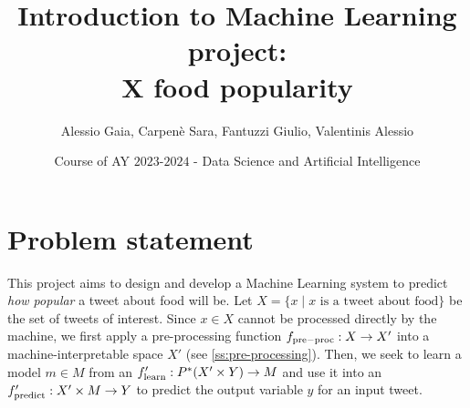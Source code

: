 \documentclass{article}
\title{Introduction to Machine Learning project:\\X food popularity}
\author[*]{Alessio Gaia, Carpenè Sara, Fantuzzi Giulio, Valentinis Alessio}
\affil[*]{
    problem statement,
    solution design,
    solution development,
    data gathering,
    writing
}
\date{Course of AY $2023$-$2024$ - Data Science and Artificial Intelligence}
\begin{document}
\maketitle

\section{Problem statement}
\label{sec:problem_statement}
This project aims to design and develop a Machine Learning system to predict \textit{how popular} a tweet about food will be. Let $X=\{x \mid x \text{ is a tweet about food}\}$ be the set of tweets of interest. Since $x \in X$ cannot be processed directly by the machine, we first apply a pre-processing function $f_{\rm pre-proc}: X \rightarrow X'$ into a machine-interpretable space $X'$ (see \cref{ss:pre-processing}). Then, we seek to learn a model $m \in M$ from an $f'_{\rm learn}: P^{*}(X' \times Y) \rightarrow M$ and use it into an $f'_{\rm predict}: X' \times M \rightarrow Y$ to predict the output variable $y$ for an input tweet.
\end{document}
